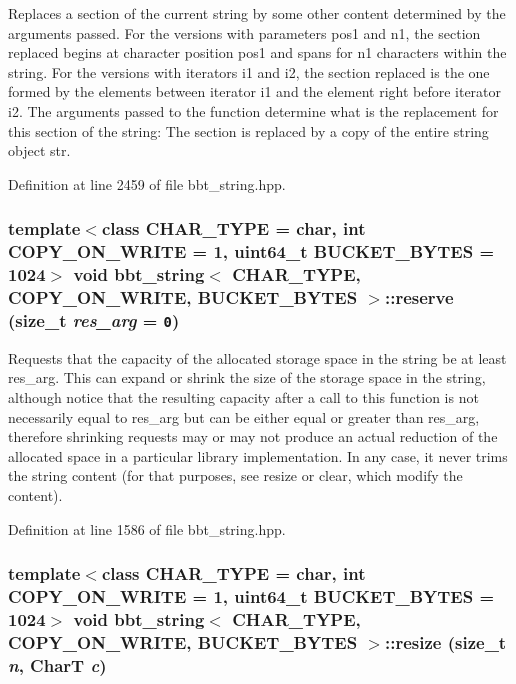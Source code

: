Replaces a section of the current string by some other content determined by the arguments passed. For the versions with parameters pos1 and n1, the section replaced begins at character position pos1 and spans for n1 characters within the string. For the versions with iterators i1 and i2, the section replaced is the one formed by the elements between iterator i1 and the element right before iterator i2. The arguments passed to the function determine what is the replacement for this section of the string: The section is replaced by a copy of the entire string object str. 

Definition at line 2459 of file bbt\_\-string.hpp.\hypertarget{classbbt__string_2c7fe2805ecfdf1d9ddcd66c4e5c80f1}{
\subsubsection[{reserve}]{\setlength{\rightskip}{0pt plus 5cm}template$<$class CHAR\_\-TYPE  = char, int COPY\_\-ON\_\-WRITE = 1, uint64\_\-t BUCKET\_\-BYTES = 1024$>$ void {\bf bbt\_\-string}$<$ CHAR\_\-TYPE, COPY\_\-ON\_\-WRITE, BUCKET\_\-BYTES $>$::reserve (size\_\-t {\em res\_\-arg} = {\tt 0})}}
\label{classbbt__string_2c7fe2805ecfdf1d9ddcd66c4e5c80f1}


Requests that the capacity of the allocated storage space in the string be at least res\_\-arg. This can expand or shrink the size of the storage space in the string, although notice that the resulting capacity after a call to this function is not necessarily equal to res\_\-arg but can be either equal or greater than res\_\-arg, therefore shrinking requests may or may not produce an actual reduction of the allocated space in a particular library implementation. In any case, it never trims the string content (for that purposes, see resize or clear, which modify the content). 

Definition at line 1586 of file bbt\_\-string.hpp.\hypertarget{classbbt__string_9a3f14ffd3caa23664570a059f5f7626}{
\subsubsection[{resize}]{\setlength{\rightskip}{0pt plus 5cm}template$<$class CHAR\_\-TYPE  = char, int COPY\_\-ON\_\-WRITE = 1, uint64\_\-t BUCKET\_\-BYTES = 1024$>$ void {\bf bbt\_\-string}$<$ CHAR\_\-TYPE, COPY\_\-ON\_\-WRITE, BUCKET\_\-BYTES $>$::resize (size\_\-t {\em n}, \/  CharT {\em c})}}
\label{classbbt__string_9a3f14ffd3caa23664570a059f5f7626}


